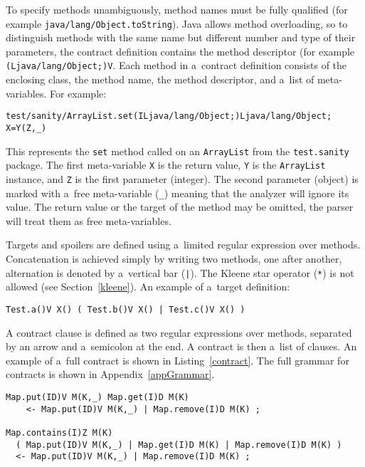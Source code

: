 To specify methods unambiguously, method names must be fully qualified (for
example \texttt{java/lang/Object.toString}). Java allows method overloading, so
to distinguish methods with the same name but different number and type of their
parameters, the contract definition contains the method descriptor (for example
\texttt{(Ljava/lang/Object;)V}. Each method in a~contract definition consists of
the enclosing class, the method name, the method descriptor, and a~list of
meta-variables. For example:

\begin{lstlisting}[frame=none]
test/sanity/ArrayList.set(ILjava/lang/Object;)Ljava/lang/Object; X=Y(Z,_)
\end{lstlisting}

This represents the \texttt{set} method called on an \texttt{ArrayList} from
the \texttt{test.sanity} package. The first meta-variable \texttt{X} is the
return value, \texttt{Y} is the \texttt{ArrayList} instance, and \texttt{Z} is
the first parameter (integer). The second parameter (object) is marked with
a~free meta-variable (\texttt{\_}) meaning that the analyzer will ignore its
value. The return value or the target of the method may be omitted, the parser
will treat them as free meta-variables.

Targets and spoilers are defined using a~limited regular expression over
methods. Concatenation is achieved simply by writing two methods, one after
another, alternation is denoted by a~vertical bar (\texttt{|}). The Kleene star
operator (\texttt{*}) is not allowed (see Section~\ref{kleene}). An example of
a~target definition:

\begin{lstlisting}[frame=none]
Test.a()V X() ( Test.b()V X() | Test.c()V X() )
\end{lstlisting}

A contract clause is defined as two regular expressions over methods, separated
by an arrow and a~semicolon at the end. A contract is then a~list of clauses. An
example of a~full contract is shown in Listing~\ref{contract}. The full grammar
for contracts is shown in Appendix~\ref{appGrammar}.

\begin{lstlisting}[label=contract, float, caption={Contract from
Chapter~\ref{chThree} written for a~Map with \texttt{int} keys and
\texttt{double} values. The first target matches an inserting element to the map
at a~given key and then retrieving it. The target can be invalidated by calling
either \texttt{put} or \texttt{get} with the same key. The second target matches
checking if a~key is present in the map and then modifying the value at the
given key. The target can be invalidated by replacing the value or by removing
it.}]
Map.put(ID)V M(K,_) Map.get(I)D M(K)
    <- Map.put(ID)V M(K,_) | Map.remove(I)D M(K) ;

Map.contains(I)Z M(K)
  ( Map.put(ID)V M(K,_) | Map.get(I)D M(K) | Map.remove(I)D M(K) )
  <- Map.put(ID)V M(K,_) | Map.remove(I)D M(K) ;
\end{lstlisting}

